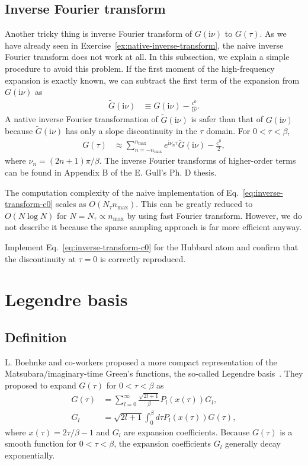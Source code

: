 \documentclass[submission, LectureNotes]{SciPost}
\newcommand\ii{\mathrm{i}}%
\newcommand\iv{\ii\nu}%
\begin{document}
\subsection{Inverse Fourier transform}\label{sec:inverse-fourier-transform}
Another tricky thing is inverse Fourier transform of $G(\iv)$ to $G(\tau)$.
As we have already seen in Exercise~\ref{ex:native-inverse-transform},
the naive inverse Fourier transform does not work at all.
In this subsection, we explain a simple procedure to avoid this problem.
If the first moment of the high-frequency expansion is exactly known,
we can subtract the first term of the expansion from $G(\iv)$ as
\begin{align}
    \tilde{G}(\iv) &\equiv G(\iv) - \frac{c^0}{\iv}.
\end{align}
A native inverse Fourier transformation of $\tilde{G}(\iv)$ is safer than that of $G(\iv)$ because 
$\tilde{G}(\iv)$ has only a slope discontinuity in the $\tau$ domain.
For $0 < \tau<\beta$,
\begin{align}
    G(\tau) &\approx \sum_{n=-n_\mathrm{max}}^{n_\mathrm{max}} e^{\ii \nu_n \tau }\tilde{G}(\iv) - \frac{c^0}{2},\label{eq:inverse-transform-c0}
\end{align}
where $\nu_n = (2n+1)\pi/\beta$.
The inverse Fourier transforms of higher-order terms can be found in Appendix B of the E. Gull's Ph. D thesis.

The computation complexity of the naive implementation of Eq.~\eqref{eq:inverse-transform-c0} scales as $O(N_\tau n_\mathrm{max})$.
This can be greatly reduced to $O(N\log N)$ for $N=N_\tau \propto n_\mathrm{max}$ by using fast Fourier transform.
However, we do not describe it because the sparse sampling approach is far more efficient anyway.

\begin{Exercise}
    Implement Eq.~\eqref{eq:inverse-transform-c0} for the Hubbard atom and confirm that the discontinuity at $\tau=0$ is correctly reproduced.
\end{Exercise}


\clearpage
\section{Legendre basis}
\subsection{Definition}
L. Boehnke and co-workers proposed a more compact representation of the Matsubara/imaginary-time Green's functions, the so-called Legendre basis~\cite{Boehnke:2011dd}.
They proposed to expand $G(\tau)$ for $0<\tau<\beta$ as
\begin{align}
    G(\tau) &= \sum_{l=0}^\infty \frac{\sqrt{2l+1}}{\beta} P_l(x(\tau)) G_l,\label{eq:legendre-gtau}\\
    G_l &= \sqrt{2l+1} \int_0^\beta d\tau P_l(x(\tau)) G(\tau),
\end{align}
where $x(\tau) = 2\tau/\beta -1$ and $G_l$ are expansion coefficients.
Because $G(\tau)$ is a smooth function for $0 < \tau < \beta$, the expansion coefficients $G_l$ generally decay exponentially.
\end{document}
